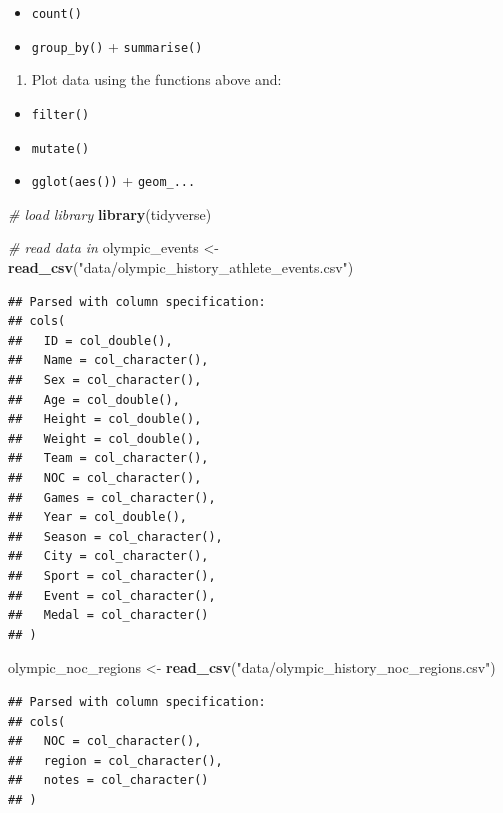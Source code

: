 \documentclass[
]{book}
\newenvironment{Shaded}{\begin{snugshade}}{\end{snugshade}}
\newcommand{\CommentTok}[1]{\textcolor[rgb]{0.56,0.35,0.01}{\textit{#1}}}
\newcommand{\KeywordTok}[1]{\textcolor[rgb]{0.13,0.29,0.53}{\textbf{#1}}}
\newcommand{\NormalTok}[1]{#1}
\newcommand{\StringTok}[1]{\textcolor[rgb]{0.31,0.60,0.02}{#1}}
\providecommand{\tightlist}{%
  \setlength{\itemsep}{0pt}\setlength{\parskip}{0pt}}
\begin{document}
\begin{itemize}
\item
  \texttt{count()}
\item
  \texttt{group\_by()} + \texttt{summarise()}
\end{itemize}

\begin{enumerate}
\def\labelenumi{\arabic{enumi}.}
\setcounter{enumi}{5}
\tightlist
\item
  Plot data using the functions above and:
\end{enumerate}

\begin{itemize}
\item
  \texttt{filter()}
\item
  \texttt{mutate()}
\item
  \texttt{gglot(aes())} + \texttt{geom\_...}
\end{itemize}

\begin{Shaded}
\begin{Highlighting}[]
\CommentTok{# load library}
\KeywordTok{library}\NormalTok{(tidyverse)}

\CommentTok{# read data in}
\NormalTok{olympic_events <-}\StringTok{ }\KeywordTok{read_csv}\NormalTok{(}\StringTok{"data/olympic_history_athlete_events.csv"}\NormalTok{)}
\end{Highlighting}
\end{Shaded}

\begin{verbatim}
## Parsed with column specification:
## cols(
##   ID = col_double(),
##   Name = col_character(),
##   Sex = col_character(),
##   Age = col_double(),
##   Height = col_double(),
##   Weight = col_double(),
##   Team = col_character(),
##   NOC = col_character(),
##   Games = col_character(),
##   Year = col_double(),
##   Season = col_character(),
##   City = col_character(),
##   Sport = col_character(),
##   Event = col_character(),
##   Medal = col_character()
## )
\end{verbatim}

\begin{Shaded}
\begin{Highlighting}[]
\NormalTok{olympic_noc_regions <-}\StringTok{ }\KeywordTok{read_csv}\NormalTok{(}\StringTok{"data/olympic_history_noc_regions.csv"}\NormalTok{)}
\end{Highlighting}
\end{Shaded}

\begin{verbatim}
## Parsed with column specification:
## cols(
##   NOC = col_character(),
##   region = col_character(),
##   notes = col_character()
## )
\end{verbatim}
\end{document}
